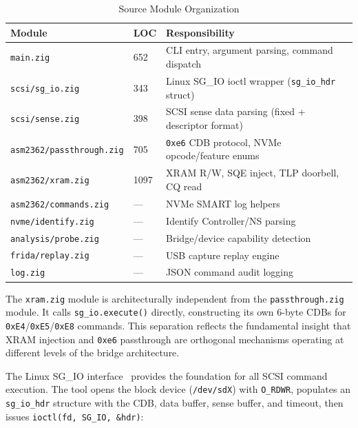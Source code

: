 \documentclass[conference]{IEEEtran}
\begin{document}
\begin{table}[ht]
\centering
\caption{Source Module Organization}
\label{tab:modules}
\begin{tabular}{@{}llp{3.5cm}@{}}
\toprule
Module & LOC & Responsibility \\
\midrule
\texttt{main.zig} & 652 & CLI entry, argument parsing, command dispatch \\
\texttt{scsi/sg\_io.zig} & 343 & Linux SG\_IO ioctl wrapper
(\texttt{sg\_io\_hdr} struct) \\
\texttt{scsi/sense.zig} & 398 & SCSI sense data parsing (fixed +
descriptor format) \\
\texttt{asm2362/passthrough.zig} & 705 & \texttt{0xe6} CDB protocol,
NVMe opcode/feature enums \\
\texttt{asm2362/xram.zig} & 1097 & XRAM R/W, SQE inject, TLP doorbell,
CQ read \\
\texttt{asm2362/commands.zig} & --- & NVMe SMART log helpers \\
\texttt{nvme/identify.zig} & --- & Identify Controller/NS parsing \\
\texttt{analysis/probe.zig} & --- & Bridge/device capability detection \\
\texttt{frida/replay.zig} & --- & USB capture replay engine \\
\texttt{log.zig} & --- & JSON command audit logging \\
\bottomrule
\end{tabular}
\end{table}

The \texttt{xram.zig} module is architecturally independent from the
\texttt{passthrough.zig} module. It calls
\texttt{sg\_io.execute()} directly, constructing its own 6-byte CDBs
for \texttt{0xE4}/\texttt{0xE5}/\texttt{0xE8} commands. This separation
reflects the fundamental insight that XRAM injection and \texttt{0xe6}
passthrough are orthogonal mechanisms operating at different levels of
the bridge architecture.

The Linux SG\_IO interface~\cite{linux-sg-io} provides the foundation
for all SCSI command execution. The tool opens the block device
(\texttt{/dev/sdX}) with \texttt{O\_RDWR}, populates an
\texttt{sg\_io\_hdr} structure with the CDB, data buffer, sense buffer,
and timeout, then issues \texttt{ioctl(fd, SG\_IO, \&hdr)}:
\end{document}

